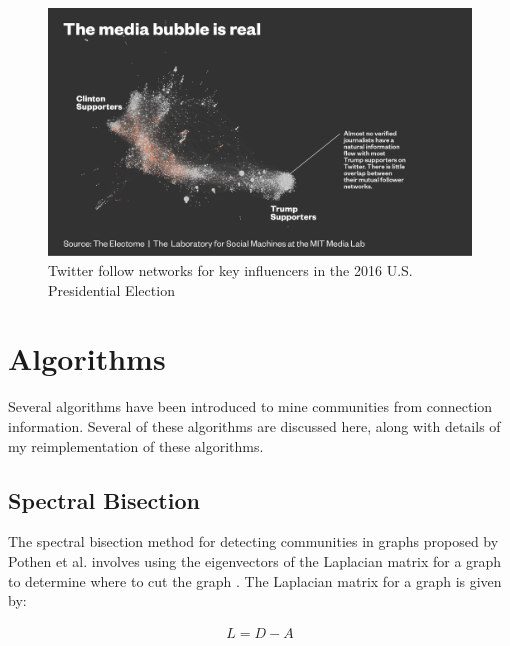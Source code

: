 \documentclass{article}
\begin{document}
\begin{figure}[h]
    \includegraphics[width=\linewidth]{./images/election.png}
    \caption{Twitter follow networks for key influencers in the 2016 U.S. Presidential Election}
    \label{election}
\end{figure}


\section{Algorithms}
Several algorithms have been introduced to mine communities from connection information. Several of these algorithms are discussed here, along with details of my reimplementation of these algorithms.

    \subsection{Spectral Bisection}
    The spectral bisection method for detecting communities in graphs proposed by Pothen et al. involves using the eigenvectors of the Laplacian matrix for a graph to determine where to cut the graph \cite{doi:10.1137/0611030}. The Laplacian matrix for a graph is given by:

    \begin{align}
        L = D - A
    \end{align}
\end{document}

